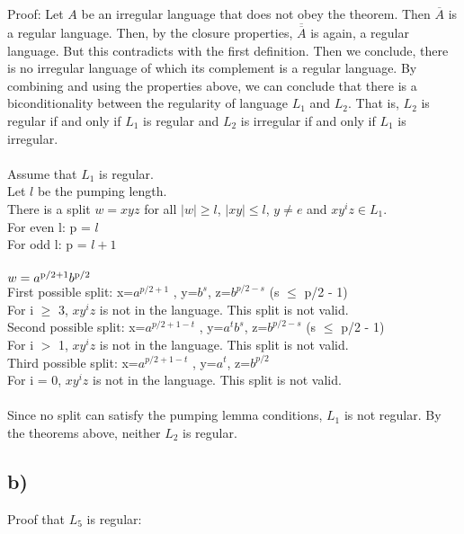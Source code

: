 \documentclass[12pt]{article}
\begin{document}
Proof: Let $A$ be an irregular language that does not obey the theorem. Then $\overline{A}$ is a regular language. Then, by the closure properties, $\overline{\overline{A}}$ is again, a regular language. But this contradicts with the first definition. Then we conclude, there is no irregular language of which its complement is a regular language.
\newpage
By combining and using the properties above, we can conclude that there is a biconditionality between the regularity of language $L_1$ and $L_2$. That is, $L_2$ is regular if and only if $L_1$ is regular and $L_2$ is irregular if and only if $L_1$ is irregular.\\\\
Assume that $L_1$ is regular.\\
Let $l$ be the pumping length.\\
There is a split $w = xyz$ for all $|w|\geq l$, $|xy|\leq l$, $y\neq e$ and $xy^iz\in L_1$.\\
For even l: p = $l$\\
For odd l: p = $l+1$\\\\
$w = a\textsuperscript{p/2+1}b\textsuperscript{p/2}$\\
First possible split: x=$a^{p/2+1}$ , y=$b^{s}$, z=$b^{p/2-s}$ (s $\leq$ p/2 - 1)\\
For i $\geq$ 3, $xy^iz$ is not in the language. This split is not valid.\\
Second possible split: x=$a^{p/2+1-t}$ , y=$a^{t}b^{s}$, z=$b^{p/2-s}$ (s $\leq$ p/2 - 1)\\
For i $>$ 1, $xy^iz$ is not in the language. This split is not valid.\\
Third possible split: x=$a^{p/2+1-t}$ , y=$a^{t}$, z=$b^{p/2}$\\
For i = 0, $xy^iz$ is not in the language. This split is not valid.\\\\

Since no split can satisfy the pumping lemma conditions, $L_1$ is not regular. By the theorems above, neither $L_2$ is regular.
\subsection*{b)}
\noindent
Proof that $L_5$ is regular:

\end{document}
